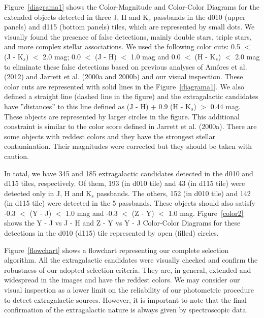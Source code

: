 \documentclass[preprint2]{aastex}
\begin{document}
Figure~\ref{diagrama1} shows the Color-Magnitude and Color-Color 
Diagrams for the
extended objects detected in three 
J, H and K$_s$ passbands in the d010 (upper panels) and d115
(bottom panels) tiles, which are
represented by small dots.   We visually found the presence of false detections,
mainly double stars, triple stars, and more complex stellar associations.
We used the following color cuts: 0.5 $<$ (J - K$_s$) $<$ 2.0 mag;
0.0 $<$ (J - H) $<$ 1.0 mag and 0.0 $<$ (H - K$_s$) $<$ 2.0 mag to
eliminate these false detections based on previous analyses
of Am{\^o}res et al. (2012) and Jarrett et al. (2000a and 2000b) and our
visual inspection.  These color cuts are represented with solid lines in
the Figure~\ref{diagrama1}.  We also defined a straight line (dashed line
in the figure) and the extragalactic candidates have ''distances'' to this
line defined as (J - H) + 0.9 (H - K$_s$) $>$ 0.44 mag.  These objects 
 are represented by larger circles in
the figure.  This additional
constraint is similar to the color score defined in Jarrett et al. (2000a).
There are some objects with reddest colors and they have the
strongest stellar contamination.  Their magnitudes were corrected but they
should be taken with caution.

  In total, we have 345 and 185 extragalactic candidates
detected in the d010 and d115 tiles, respectively.  
Of them, 193 (in d010 tile) and 43 (in d115 tile) were detected only
in  J, H and K$_s$ passbands.  The others,  152 (in d010 tile) and 142
(in d115 tile) were detected in the 5 passbands.  These objects should also
satisfy -0.3 $<$ (Y - J) $<$ 1.0 mag and 
-0.3 $<$ (Z - Y) $<$ 1.0 mag. Figure~\ref{color2} shows
the  Y - J vs J - H and Z - Y vs Y - J Color-Color Diagrams for these
detections in the d010 (d115) tile
  represented by open (filled) circles.

  Figure~\ref{flowchart} shows a flowchart
representing our complete selection algorithm.   
    All the extragalactic candidates were visually checked and confirm the robustness of our
    adopted selection criteria. %
    They  are, in general,  extended and widespread in the
  images and have the reddest colors.  We
may consider our visual inspection as a lower limit on the reliability of our
photometric procedure to detect extragalactic sources. However, it is important to note that the
final confirmation of the
extragalactic nature  is always given by spectroscopic data.  
\end{document}
